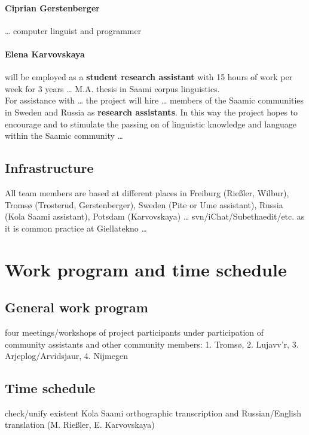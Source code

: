 \documentclass[a4paper,12pt]{article}
\begin{document}
\paragraph{Ciprian Gerstenberger} … computer linguist and programmer

\paragraph{Elena Karvovskaya} will be employed as a \textbf{student research assistant} with 15 hours of work per week for 3 years … M.A. thesis in Saami corpus linguistics.\\

For assistance with … the project will hire … members of the Saamic communities in Sweden and Russia as \textbf{research assistants}. In this way the project hopes to encourage and to stimulate the passing on of linguistic knowledge and language within the Saamic community …

\subsection{Infrastructure}
All team members are based at different places in Freiburg (Rießler, Wilbur), Tromsø (Trosterud, Gerstenberger), Sweden (Pite or Ume assistant), Russia (Kola Saami assistant), Potsdam (Karvovskaya) … svn/iChat/Subethaedit/etc. as it is common practice at Giellatekno …

\section{Work program and time schedule}
\subsection{General work program}

four meetings/workshops of project participants under participation of community assistants and other community members: 1. Tromsø, 2. Lujavv'r, 3. Arjeplog/Arvidsjaur, 4. Nijmegen %

\subsection{Time schedule}

check/unify existent Kola Saami orthographic transcription and Russian/English translation (M. Rießler, E. Karvovskaya)
\end{document}
